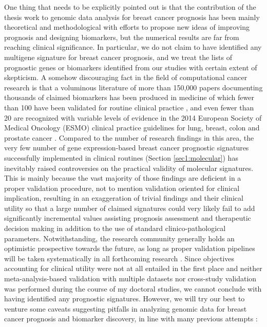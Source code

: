 One thing that needs to be explicitly pointed out is that the contribution of the thesis work to genomic data analysis for breast cancer prognosis has been mainly theoretical and methodological with efforts to propose new ideas of improving prognosis and designing biomarkers, but the numerical results are far from reaching clinical significance. In particular, we do not claim to have identified any multigene signature for breast cancer prognosis, and we treat the lists of prognostic genes or biomarkers identified from our studies with certain extent of skepticism. A somehow discouraging fact in the field of computational cancer research is that a voluminous literature of more than 150,000 papers documenting thousands of claimed biomarkers has been produced in medicine of which fewer than 100 have been validated for routine clinical practice \cite{Poste2011Bring}, and even fewer than 20 are recognized with variable levels of evidence in the 2014 European Society of Medical Oncology (ESMO) clinical practice guidelines for lung, breast, colon and prostate cancer \cite{Schneider2015Establishing}. Compared to the number of research findings in this area, the very few number of gene expression-based breast cancer prognostic signatures successfully implemented in clinical routines (Section \ref{sec1:molecular}) has inevitably raised controversies on the practical validity of molecular signatures. This is mainly because the vast majority of those findings are deficient in a proper validation procedure, not to mention validation oriented for clinical implication, resulting in an exaggeration of trivial findings and their clinical utility so that a large number of claimed signatures could very likely fail to add significantly incremental values assisting prognosis assessment and therapeutic decision making in addition to the use of standard clinico-pathological parameters. Notwithstanding, the research community generally holds an optimistic prospective towards the future, as long as proper validation pipelines will be taken systematically in all forthcoming research \cite{Michiels2016Statistical}. Since objectives accounting for clinical utility were not at all entailed in the first place and neither meta-analysis-based validation with multiple datasets nor cross-study validation was performed during the course of my doctoral studies, we cannot conclude with having identified any prognostic signatures. However, we will try our best to venture some caveats suggesting pitfalls in analyzing genomic data for breast cancer prognosis and biomarker discovery, in line with many previous attempts \cite{Ambroise2002Selection, Simon2003Pitfalls}:


